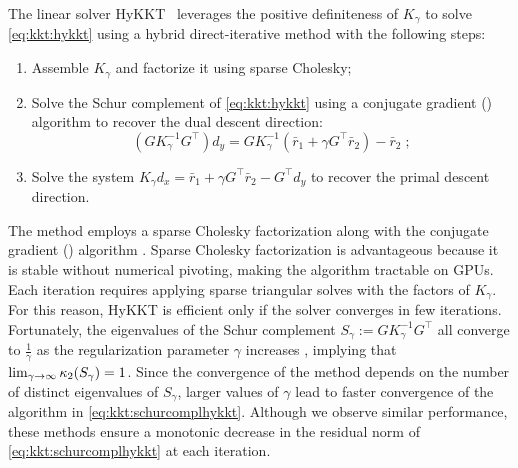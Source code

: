 The linear solver HyKKT~\cite{regev2023hykkt} leverages the positive definiteness of $K_\gamma$ to solve \eqref{eq:kkt:hykkt} using a hybrid direct-iterative method with the following steps:
\begin{enumerate}
  \item Assemble $K_\gamma$ and factorize it using sparse Cholesky;
  \item Solve the Schur complement of \eqref{eq:kkt:hykkt} using a conjugate gradient (\CG) algorithm to recover the dual descent direction:
    \begin{equation}
      \label{eq:kkt:schurcomplhykkt}
      (G K_\gamma^{-1} G^\top) d_y = G K_\gamma^{-1} (\bar{r}_1 + \gamma G^\top \bar{r}_2) - \bar{r}_2 \; ;
    \end{equation}
  \item Solve the system $K_\gamma d_x = \bar{r}_1 + \gamma G^\top \bar{r}_2 - G^\top d_y$ to recover the primal descent direction.
\end{enumerate}
The method employs a sparse Cholesky factorization along with the conjugate gradient (\CG) algorithm \cite{hestenes-stiefel-1952}.
Sparse Cholesky factorization is advantageous because it is stable without
numerical pivoting, making the algorithm tractable on GPUs.
Each \CG iteration requires applying sparse triangular solves with the factors of $K_\gamma$.
For this reason, HyKKT is efficient only if the \CG solver converges in few iterations.
Fortunately, the eigenvalues of the Schur complement $S_\gamma := G
K_\gamma^{-1} G^\top$ all converge to $\frac{1}{\gamma}$ as the
regularization parameter $\gamma$ increases \cite[Theorem 4]{regev2023hykkt},
implying that $\lim_{\gamma \to \infty} \kappa_2(S_\gamma) = 1$.
Since the convergence of the \CG method depends on the number of distinct
eigenvalues of $S_{\gamma}$, larger values of $\gamma$ lead to faster convergence of the \CG algorithm in \eqref{eq:kkt:schurcomplhykkt}.
Although we observe similar performance, these methods ensure a monotonic decrease in the residual norm of \eqref{eq:kkt:schurcomplhykkt} at each iteration.

